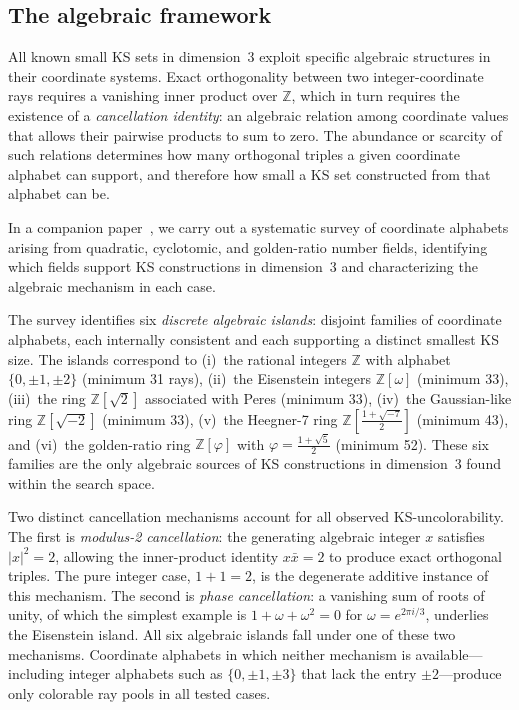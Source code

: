 \documentclass[twocolumn,pra,superscriptaddress,nofootinbib]{revtex4-2}
\newcommand{\Z}{\mathbb{Z}}
\begin{document}
\subsection{The algebraic framework}
\label{sec:prior:algebraic}

All known small KS sets in dimension~3 exploit specific algebraic structures in
their coordinate systems.  Exact orthogonality between two integer-coordinate
rays requires a vanishing inner product over $\Z$, which in turn requires the
existence of a \emph{cancellation identity}: an algebraic relation among
coordinate values that allows their pairwise products to sum to zero.  The
abundance or scarcity of such relations determines how many orthogonal triples
a given coordinate alphabet can support, and therefore how small a KS set
constructed from that alphabet can be.

In a companion paper~\cite{Kernaghan2026algebraic}, we carry out a systematic
survey of coordinate alphabets arising from quadratic, cyclotomic, and
golden-ratio number fields, identifying which fields support KS constructions
in dimension~3 and characterizing the algebraic mechanism in each case.

The survey identifies six \emph{discrete algebraic islands}: disjoint families
of coordinate alphabets, each internally consistent and each supporting a
distinct smallest KS size.  The islands correspond to (i)~the rational integers
$\Z$ with alphabet $\{0,\pm 1,\pm 2\}$ (minimum 31 rays), (ii)~the Eisenstein
integers $\Z[\omega]$ (minimum 33), (iii)~the ring $\Z[\sqrt{2}]$ associated
with Peres (minimum 33), (iv)~the Gaussian-like ring $\Z[\sqrt{-2}]$ (minimum
33), (v)~the Heegner-7 ring $\Z[\tfrac{1+\sqrt{-7}}{2}]$ (minimum 43), and
(vi)~the golden-ratio ring $\Z[\varphi]$ with $\varphi = \tfrac{1+\sqrt{5}}{2}$
(minimum 52).  These six families are the only algebraic sources of KS
constructions in dimension~3 found within the search space.

Two distinct cancellation mechanisms account for all observed KS-uncolorability.
The first is \emph{modulus-2 cancellation}: the generating algebraic integer $x$
satisfies $|x|^2 = 2$, allowing the inner-product identity $x\bar{x} = 2$
to produce exact orthogonal triples.  The pure integer case, $1 + 1 = 2$, is
the degenerate additive instance of this mechanism.  The second is
\emph{phase cancellation}: a vanishing sum of roots of unity, of which the
simplest example is $1 + \omega + \omega^2 = 0$ for $\omega = e^{2\pi i/3}$,
underlies the Eisenstein island.  All six algebraic islands fall under one of
these two mechanisms.  Coordinate alphabets in which neither mechanism is
available---including integer alphabets such as $\{0, \pm 1, \pm 3\}$ that lack
the entry $\pm 2$---produce only colorable ray pools in all tested cases.
\end{document}
